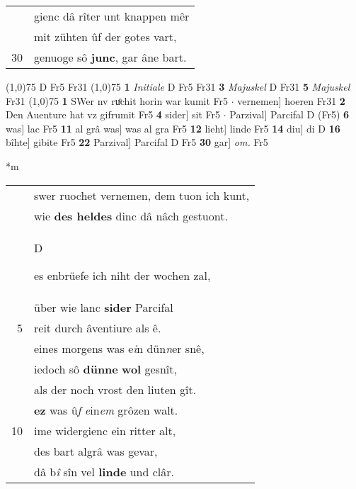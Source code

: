 \documentclass[8pt,a4paper,notitlepage]{article}
\begin{document}
\begin{table}[ht]
\begin{minipage}[t]{0.5\linewidth}
\begin{tabular}{rl}
 & gienc dâ rîter unt knappen mêr\\ 
 & mit zühten ûf der gotes vart,\\ 
30 & genuoge sô \textbf{junc}, gar âne bart.\\ 
\end{tabular}
\scriptsize
\line(1,0){75} \newline
D Fr5 Fr31 \newline
\line(1,0){75} \newline
\textbf{1} \textit{Initiale} D Fr5 Fr31  \textbf{3} \textit{Majuskel} D Fr31  \textbf{5} \textit{Majuskel} Fr31  \newline
\line(1,0){75} \newline
\textbf{1} SWer nv ruͦchit horin war kumit Fr5  $\cdot$ vernemen] hoeren Fr31 \textbf{2} Den Auenture hat vz gifrumit Fr5 \textbf{4} sider] sit Fr5  $\cdot$ Parzival] Parcifal D (Fr5) \textbf{6} was] lac Fr5 \textbf{11} al grâ was] was al gra Fr5 \textbf{12} lieht] linde Fr5 \textbf{14} diu] di D \textbf{16} bîhte] gibite Fr5 \textbf{22} Parzival] Parcifal D Fr5 \textbf{30} gar] \textit{om.} Fr5 \newline
\end{minipage}
\hspace{0.5cm}
\begin{minipage}[t]{0.5\linewidth}
\small
\begin{center}*m
\end{center}
\begin{tabular}{rl}
 & swer ruochet vernemen, dem tuon ich kunt,\\ 
 & wie \textbf{des heldes} dinc dâ nâch gestuont.\\ 
 & \begin{large}D\end{large}es enbrüefe ich niht der wochen zal,\\ 
 & über wie lanc \textbf{sider} Parcifal\\ 
5 & reit durch âventiure als ê.\\ 
 & eines morgens was e\textit{i}n dün\textit{n}er snê,\\ 
 & iedoch sô \textbf{dünne} \textbf{wol} gesnît,\\ 
 & als der noch vrost den liuten gît.\\ 
 & \textbf{ez} was û\textit{f} \textit{e}in\textit{em} grôzen walt.\\ 
10 & ime widergienc ein ritter alt,\\ 
 & des bart algrâ was gevar,\\ 
 & dâ b\textit{î} sîn vel \textbf{linde} und clâr.\\ 

\end{tabular}
\end{minipage}
\end{table}
\end{document}
